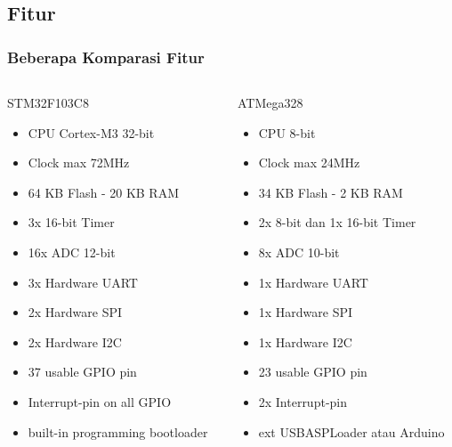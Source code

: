 \documentclass[table,dvipsnames]{beamer}
\begin{document}
	\subsection{Fitur}
	\begin{frame}
		\frametitle{Beberapa Komparasi Fitur}
		\begin{columns}[T]
			\begin{column}{.48\textwidth}
				STM32F103C8
				\begin{itemize}
					\item CPU Cortex-M3 32-bit
					\item Clock max 72MHz
					\item 64 KB Flash - 20 KB RAM
					\item 3x 16-bit Timer
					\item 16x ADC 12-bit
					\item 3x Hardware UART
					\item 2x Hardware SPI
					\item 2x Hardware I2C
					\item 37 usable GPIO pin
					\item Interrupt-pin on all GPIO
					\item built-in programming bootloader
				\end{itemize}
			\end{column}
			\begin{column}{.48\textwidth}
				ATMega328
				\begin{itemize}
					\item CPU 8-bit
					\item Clock max 24MHz
					\item 34 KB Flash - 2 KB RAM
					\item 2x 8-bit dan 1x 16-bit Timer
					\item 8x ADC 10-bit
					\item 1x Hardware UART
					\item 1x Hardware SPI
					\item 1x Hardware I2C
					\item 23 usable GPIO pin
					\item 2x Interrupt-pin
					\item ext USBASPLoader atau Arduino
				\end{itemize}
			\end{column}
		\end{columns}
	\end{frame}
\end{document}
